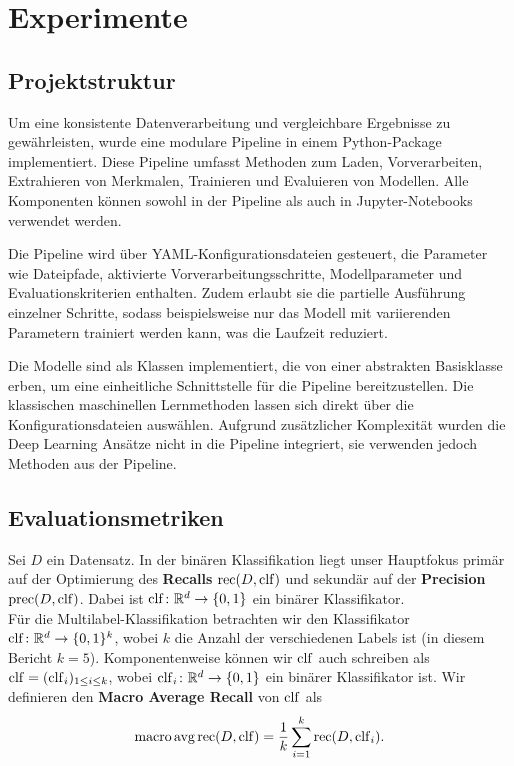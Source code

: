 \section{Experimente}

\subsection{Projektstruktur}
\label{sec:projektstruktur}
Um eine konsistente Datenverarbeitung und vergleichbare Ergebnisse zu gewährleisten, wurde eine modulare Pipeline in einem Python-Package implementiert. Diese Pipeline umfasst Methoden zum Laden, Vorverarbeiten, Extrahieren von Merkmalen, Trainieren und Evaluieren von Modellen. Alle Komponenten können sowohl in der Pipeline als auch in Jupyter-Notebooks verwendet werden. 

Die Pipeline wird über YAML-Konfigurationsdateien gesteuert, die Parameter wie Dateipfade, aktivierte Vorverarbeitungsschritte, Modellparameter und Evaluationskriterien enthalten. Zudem erlaubt sie die partielle Ausführung einzelner Schritte, sodass beispielsweise nur das Modell mit variierenden Parametern trainiert werden kann, was die Laufzeit reduziert.

Die Modelle sind als Klassen implementiert, die von einer abstrakten Basisklasse erben, um eine einheitliche Schnittstelle für die Pipeline bereitzustellen. Die klassischen maschinellen Lernmethoden lassen sich direkt über die Konfigurationsdateien auswählen. Aufgrund zusätzlicher Komplexität wurden die Deep Learning Ansätze nicht in die Pipeline integriert, sie verwenden jedoch Methoden aus der Pipeline.

\subsection{Evaluationsmetriken}
\label{sec:evaluationsmetriken}
Sei $D$ ein Datensatz. In der binären Klassifikation liegt unser Hauptfokus primär auf der Optimierung des \textbf{Recalls} $\operatorname{rec}(D, \operatorname{clf})$ und sekundär auf der \textbf{Precision} $\operatorname{prec}(D, \operatorname{clf})$. Dabei ist $\operatorname{clf}\colon\mathbb{R}^d\to \{0, 1\}$ ein binärer Klassifikator.\\

Für die Multilabel-Klassifikation betrachten wir den Klassifikator $\operatorname{clf}\colon\mathbb{R}^d\to\{0, 1\}^k$, wobei $k$ die Anzahl der verschiedenen Labels ist (in diesem Bericht $k=5$). Komponentenweise können wir $\operatorname{clf}$ auch schreiben als $\operatorname{clf} = (\operatorname{clf}_i)_{1\leq i\leq k}$, wobei $\operatorname{clf}_i\colon\mathbb{R}^d\to\{0, 1\}$ ein binärer Klassifikator ist. Wir definieren den \textbf{Macro Average Recall} von $\operatorname{clf}$ als
\begin{equation*}
    \operatorname{macro\,avg\,rec}(D, \operatorname{clf}) = \frac{1}{k}\sum_{i=1}^k\operatorname{rec} (D, \operatorname{clf}_i).
\end{equation*}

